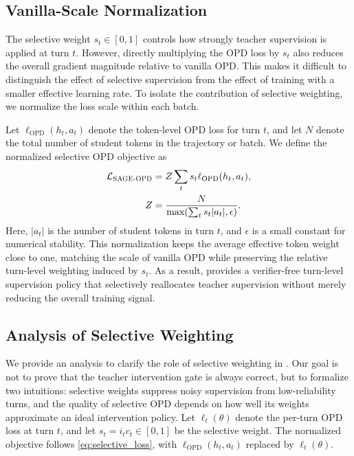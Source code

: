 \subsection{Vanilla-Scale Normalization}

The selective weight $s_t\in[0,1]$ controls how strongly teacher supervision is applied at turn $t$.
%
However, directly multiplying the OPD loss by $s_t$ also reduces the overall gradient magnitude relative to vanilla OPD.
%
This makes it difficult to distinguish the effect of selective supervision from the effect of training with a smaller effective learning rate.
%
To isolate the contribution of selective weighting, we normalize the loss scale within each batch.

Let $\ell_{\mathrm{OPD}}(h_t,a_t)$ denote the token-level OPD loss for turn $t$, and let $N$ denote the total number of student tokens in the trajectory or batch.
%
We define the normalized selective OPD objective as
\begin{equation}
\label{eq:selective_loss}
\begin{aligned}
\mathcal{L}_{\textsc{SAGE-OPD}}
&=
Z\sum_{t}
s_t\ell_{\mathrm{OPD}}(h_t,a_t), \\
Z
&=
\frac{N}{
\max\!\left(
\sum_{t}s_t|a_t|,
\epsilon
\right)} .
\end{aligned}
\end{equation}
%
Here, $|a_t|$ is the number of student tokens in turn $t$, and $\epsilon$ is a small constant for numerical stability.
%
This normalization keeps the average effective token weight close to one, matching the scale of vanilla OPD while preserving the relative turn-level weighting induced by $s_t$.
%
As a result, \ours{} provides a verifier-free turn-level supervision policy that selectively reallocates teacher supervision without merely reducing the overall training signal.

\subsection{Analysis of Selective Weighting}
\label{sec:theory}

We provide an analysis to clarify the role of selective weighting in \ours{}.
%
Our goal is not to prove that the teacher intervention gate is always correct, but to formalize two intuitions: selective weights suppress noisy supervision from low-reliability turns, and the quality of selective OPD depends on how well its weights approximate an ideal intervention policy.
%
Let $\ell_t(\theta)$ denote the per-turn OPD loss at turn $t$, and let $s_t=i_tc_t\in[0,1]$ be the selective weight.
%
The normalized objective follows \eqref{eq:selective_loss}, with $\ell_{\mathrm{OPD}}(h_t,a_t)$ replaced by $\ell_t(\theta)$.

